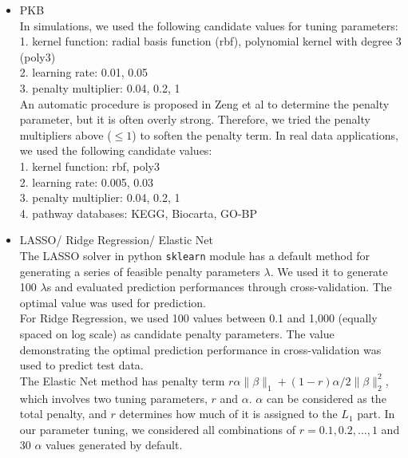 \documentclass[a4paper,12pt]{article}
\newcommand{\ttt}[1]{\texttt{#1}}
\begin{document}
	\begin{itemize}
		\item PKB\\
		In simulations, we used the following candidate values for tuning parameters:\\
		1. kernel function: radial basis function (rbf), polynomial kernel with degree 3 (poly3)\\
		2. learning rate: 0.01, 0.05\\
		3. penalty multiplier: 0.04, 0.2, 1\\
		An automatic procedure is proposed in Zeng et al\cite{zeng2019pathway} to determine the penalty parameter, but it is often overly strong. Therefore, we tried the penalty multipliers above ($\leq 1$) to soften the penalty term. In real data applications, we used the following candidate values:\\
		1. kernel function: rbf, poly3\\
		2. learning rate: 0.005, 0.03\\
		3. penalty multiplier: 0.04, 0.2, 1\\
		4. pathway databases: KEGG, Biocarta, GO-BP
		
		\item LASSO/ Ridge Regression/ Elastic Net\\
		The LASSO solver in python \ttt{sklearn} module has a default method for generating a series of feasible penalty parameters $\lambda$. We used it to generate 100 $
		\lambda$s and evaluated prediction performances through cross-validation. The optimal value was used for prediction.\\
		For Ridge Regression, we used 100 values between 0.1 and 1,000 (equally spaced on log scale) as candidate penalty parameters. The value demonstrating the optimal prediction performance in cross-validation was used to predict test data.\\
		The Elastic Net method has penalty term $ r \alpha \|\beta\|_1 + (1-r)\alpha/2 \|\beta\|^2_2$, which involves two tuning parameters, $r$ and $\alpha$. $\alpha$ can be considered as the total penalty, and $r$ determines how much of it is assigned to the $L_1$ part. In our parameter tuning, we considered all combinations of $r = 0.1, 0.2, \ldots, 1$ and 30 $\alpha$ values generated by default.
		

\end{itemize}
\end{document}
